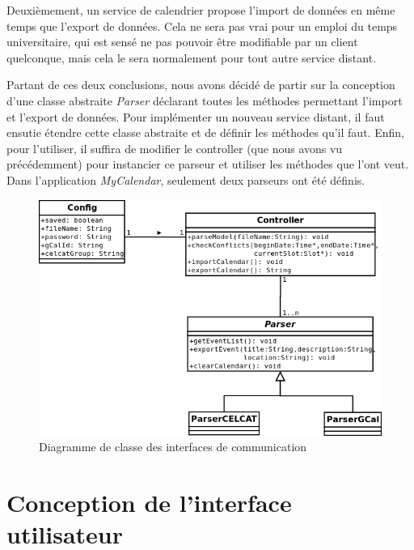 	Deuxièmement, un service de calendrier propose l'import de données en même temps que l'export de données. Cela ne sera pas vrai pour un emploi du temps universitaire, qui est sensé ne pas pouvoir être modifiable par un client quelconque, mais cela le sera normalement pour tout autre service distant.
	
	Partant de ces deux conclusions, nous avons décidé de partir sur la conception d'une classe abstraite \emph{Parser} déclarant toutes les méthodes permettant l'import et l'export de données. Pour implémenter un nouveau service distant, il faut ensutie étendre cette classe abstraite et de définir les méthodes qu'il faut. Enfin, pour l'utiliser, il suffira de modifier le controller (que nous avons vu précédemment) pour instancier ce parseur et utiliser les méthodes que l'ont veut.\\
	
	Dans l'application \emph{MyCalendar}, seulement deux parseurs ont été définis.
	\begin{figure}
		\centering
		\includegraphics[scale=0.65]{diagclasses_parser.png}
		\caption{Diagramme de classe des interfaces de communication}
	\end{figure}
	\FloatBarrier

\chapter{Conception de l'interface utilisateur}

